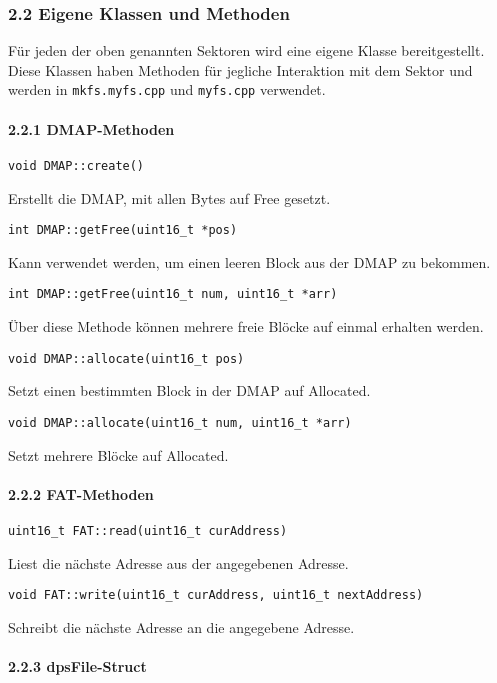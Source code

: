 \documentclass[]{article}
\let\oldparagraph\paragraph
\renewcommand{\paragraph}[1]{\oldparagraph{#1}\mbox{}}
\begin{document}
\hypertarget{eigene-klassen-und-methoden}{%
\subsubsection{2.2 Eigene Klassen und
Methoden}\label{eigene-klassen-und-methoden}}

Für jeden der oben genannten Sektoren wird eine eigene Klasse
bereitgestellt. Diese Klassen haben Methoden für jegliche Interaktion
mit dem Sektor und werden in \texttt{mkfs.myfs.cpp} und
\texttt{myfs.cpp} verwendet.

\hypertarget{dmap-methoden}{%
\paragraph{2.2.1 DMAP-Methoden}\label{dmap-methoden}}

\texttt{void\ DMAP::create()}

Erstellt die DMAP, mit allen Bytes auf Free gesetzt.

\texttt{int\ DMAP::getFree(uint16\_t\ *pos)}

Kann verwendet werden, um einen leeren Block aus der DMAP zu bekommen.

\texttt{int\ DMAP::getFree(uint16\_t\ num,\ uint16\_t\ *arr)}

Über diese Methode können mehrere freie Blöcke auf einmal erhalten
werden.

\texttt{void\ DMAP::allocate(uint16\_t\ pos)}

Setzt einen bestimmten Block in der DMAP auf Allocated.

\texttt{void\ DMAP::allocate(uint16\_t\ num,\ uint16\_t\ *arr)}

Setzt mehrere Blöcke auf Allocated.

\hypertarget{fat-methoden}{%
\paragraph{2.2.2 FAT-Methoden}\label{fat-methoden}}

\texttt{uint16\_t\ FAT::read(uint16\_t\ curAddress)}

Liest die nächste Adresse aus der angegebenen Adresse.

\texttt{void\ FAT::write(uint16\_t\ curAddress,\ uint16\_t\ nextAddress)}

Schreibt die nächste Adresse an die angegebene Adresse.

\hypertarget{dpsfile-struct}{%
\paragraph{2.2.3 dpsFile-Struct}\label{dpsfile-struct}}
\end{document}
